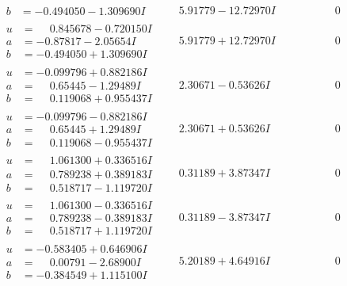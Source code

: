 \documentclass[1p]{elsarticle_modified}
\theoremstyle{definition}
\begin{document}
$$\begin{array}{c|c|c}
\begin{aligned}
b &= -0.494050 - 1.309690 I\end{aligned}
 & \phantom{-}5.91779 - 12.72970 I & \phantom{-0.000000 } 0 \\ \hline\begin{aligned}
u &= \phantom{-}0.845678 - 0.720150 I \\
a &= -0.87817 - 2.05654 I \\
b &= -0.494050 + 1.309690 I\end{aligned}
 & \phantom{-}5.91779 + 12.72970 I & \phantom{-0.000000 } 0 \\ \hline\begin{aligned}
u &= -0.099796 + 0.882186 I \\
a &= \phantom{-}0.65445 - 1.29489 I \\
b &= \phantom{-}0.119068 + 0.955437 I\end{aligned}
 & \phantom{-}2.30671 - 0.53626 I & \phantom{-0.000000 } 0 \\ \hline\begin{aligned}
u &= -0.099796 - 0.882186 I \\
a &= \phantom{-}0.65445 + 1.29489 I \\
b &= \phantom{-}0.119068 - 0.955437 I\end{aligned}
 & \phantom{-}2.30671 + 0.53626 I & \phantom{-0.000000 } 0 \\ \hline\begin{aligned}
u &= \phantom{-}1.061300 + 0.336516 I \\
a &= \phantom{-}0.789238 + 0.389183 I \\
b &= \phantom{-}0.518717 - 1.119720 I\end{aligned}
 & \phantom{-}0.31189 + 3.87347 I & \phantom{-0.000000 } 0 \\ \hline\begin{aligned}
u &= \phantom{-}1.061300 - 0.336516 I \\
a &= \phantom{-}0.789238 - 0.389183 I \\
b &= \phantom{-}0.518717 + 1.119720 I\end{aligned}
 & \phantom{-}0.31189 - 3.87347 I & \phantom{-0.000000 } 0 \\ \hline\begin{aligned}
u &= -0.583405 + 0.646906 I \\
a &= \phantom{-}0.00791 - 2.68900 I \\
b &= -0.384549 + 1.115100 I\end{aligned}
 & \phantom{-}5.20189 + 4.64916 I & \phantom{-0.000000 } 0 \\ \hline\begin{aligned}

\end{aligned}
\end{array}$$
\end{document}
